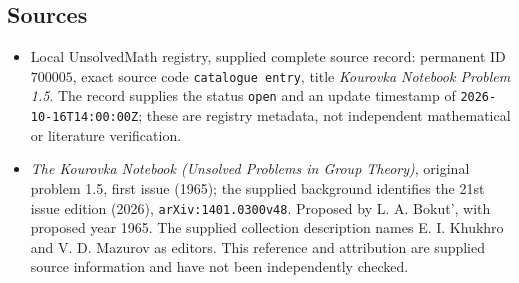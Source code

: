 \documentclass[11pt]{article}
\begin{document}
\subsection{Sources}
\begin{itemize}
\item Local UnsolvedMath registry, supplied complete source record: permanent ID \(700005\), exact source code \texttt{catalogue entry}, title \emph{Kourovka Notebook Problem 1.5}. The record supplies the status \texttt{open} and an update timestamp of \texttt{2026-10-16T14:00:00Z}; these are registry metadata, not independent mathematical or literature verification.
\item \emph{The Kourovka Notebook (Unsolved Problems in Group Theory)}, original problem 1.5, first issue (1965); the supplied background identifies the 21st issue edition (2026), \texttt{arXiv:1401.0300v48}. Proposed by L. A. Bokut', with proposed year 1965. The supplied collection description names E. I. Khukhro and V. D. Mazurov as editors. This reference and attribution are supplied source information and have not been independently checked.
\end{itemize}
\end{document}
